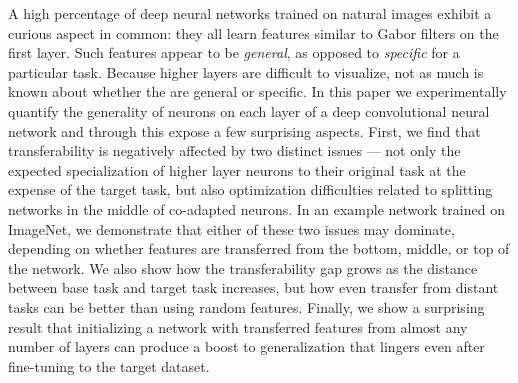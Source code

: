 
A high percentage of deep neural networks trained on
natural images exhibit a curious aspect in common: they all learn
features similar to Gabor filters on the first layer. Such features
appear to be \emph{general}, as opposed to \emph{specific} for a
particular task. Because higher layers are difficult to visualize, not
as much is known about whether the are general or specific. In this
paper we experimentally quantify the generality of neurons on each
layer of a deep convolutional neural network and through this expose a
few surprising aspects. First, we find that transferability is
negatively affected by two distinct issues --- not only the expected
specialization of higher layer neurons to their original task at the
expense of the target task, but also optimization difficulties related
to splitting networks in the middle of co-adapted neurons. In an
example network trained on ImageNet, we demonstrate that either of
these two issues may dominate, depending on whether features are
transferred from the bottom, middle, or top of the network.  We also
show how the transferability gap grows as the distance between base
task and target task increases, but how even transfer from distant
tasks can be better than using random features. Finally, we show a
surprising result that initializing a network with transferred
features from almost any number of layers can produce a boost to
generalization that lingers even after fine-tuning to the target
dataset.
